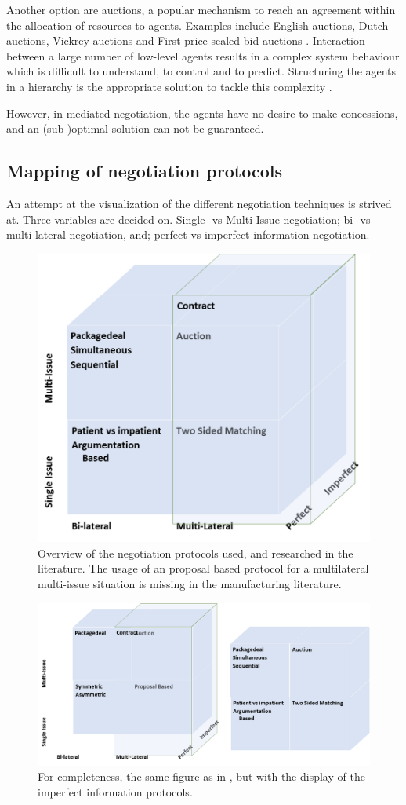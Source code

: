 Another option are auctions, a popular mechanism to reach an agreement within the allocation of resources to agents. Examples include English auctions, Dutch auctions, Vickrey auctions and First-price sealed-bid auctions \citep{wooldridge2009introduction}. Interaction between a large number of low-level agents results in a complex system behaviour which is difficult to understand, to control and to predict. Structuring the agents in a hierarchy is the appropriate solution to tackle this complexity \citep{van1998reference}.

However, in mediated negotiation, the agents have no desire to make concessions, and an (sub-)optimal solution can not be guaranteed.

\subsection{Mapping of negotiation protocols}
An attempt at the visualization of the different negotiation techniques is strived at. Three variables are decided on. Single- vs Multi-Issue negotiation; bi- vs multi-lateral negotiation, and; perfect vs imperfect information negotiation.  
\begin{figure}[h]
	\centering
	\includegraphics[width=0.7\linewidth]{img/mapping_nego}
	\caption{Overview of the negotiation protocols used, and researched in the literature. The usage of an proposal based protocol for a multilateral multi-issue situation is missing in the manufacturing literature.}
	\label{fig:mapping_nego}
\end{figure}


\begin{figure}[h]
	\centering
	\includegraphics[width=0.9\linewidth]{img/mapping_nego2}
	\caption{For completeness, the same figure as in , but with the display of the imperfect information protocols.}
	\label{fig:mapping_nego2}
\end{figure}

